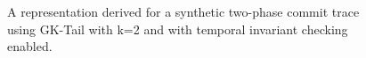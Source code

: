 \begin{figure}[!t]
  \caption{A representation derived for a synthetic two-phase commit
    trace using GK-Tail with k=2 and with temporal invariant checking
    enabled.}
  \label{fig:2pc_k2_inv}
\end{figure}


